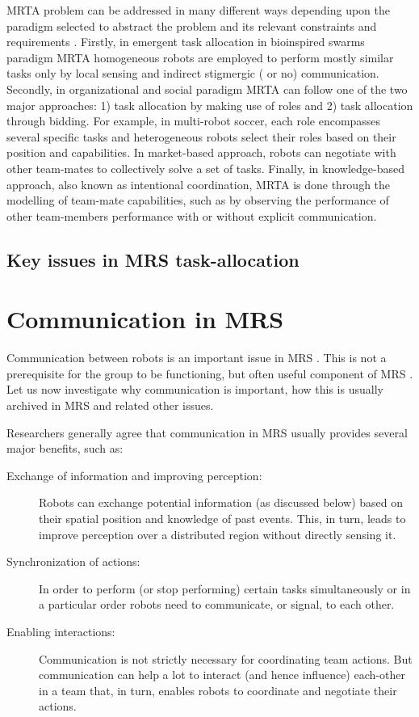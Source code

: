 MRTA problem can be addressed in many different ways depending upon the paradigm selected to abstract the problem and its relevant constraints and requirements \cite{Parker2008}. Firstly, in emergent task allocation in bioinspired swarms paradigm MRTA homogeneous robots are employed to perform mostly similar tasks only by local sensing and indirect stigmergic ( or no) communication. Secondly, in organizational and social paradigm MRTA can follow one of the two major approaches: 1) task allocation by making use of roles and 2) task allocation through bidding. For example, in multi-robot soccer, each role encompasses several specific tasks and heterogeneous robots select their roles based on their position and capabilities. In market-based approach, robots can negotiate with other team-mates to collectively solve a set of tasks. Finally, in knowledge-based approach, also known as intentional coordination, MRTA is done through the modelling of team-mate capabilities, such as by observing the performance of other team-members performance with or without explicit communication.

\subsection{Key issues in MRS task-allocation}
\section{Communication in MRS}
\label{bg:mrs-comm}
Communication between robots is an  important issue in MRS \cite{Arkin1998}. This is not a prerequisite for the group to be functioning, but often useful component of MRS \cite{Mataric2007}. Let us now investigate why communication is important, how this is usually archived in MRS and related other issues.

Researchers generally agree that communication in MRS usually provides several major benefits, such as:

\begin{description}
\item[Exchange of information and improving perception:]
Robots  can exchange potential information (as discussed below) based on their spatial position and knowledge of past events. This, in turn, leads to improve perception over a distributed region without directly sensing it.
\item[Synchronization of actions:]
In order to perform (or stop performing) certain tasks simultaneously or in a particular order robots need to communicate, or signal, to each other. 
\item[Enabling interactions:]
Communication is not strictly necessary for coordinating team actions. But  communication can help a lot to interact (and hence influence) each-other in a team that, in turn, enables robots to coordinate and negotiate their actions.
\end{description}

